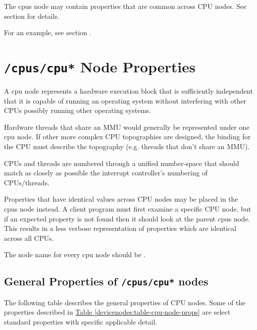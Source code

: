 \documentclass[a4paper,10pt,oneside]{sphinxmanual}
\begin{document}
The cpus node may contain properties that are common across CPU nodes.
See section {\hyperref[devicenodes:sect\string-cpus\string-cpu\string-node\string-properties]{}} for details.

For an example, see section {\hyperref[devicenodes:sect\string-cpu\string-node\string-example]{}}.


\section{\texttt{/cpus/cpu*} Node Properties}
\label{devicenodes:sect-cpus-cpu-node-properties}\label{devicenodes:cpus-cpu-node-properties}
A cpu node represents a hardware execution block that is sufficiently
independent that it is capable of running an operating system without
interfering with other CPUs possibly running other operating systems.

Hardware threads that share an MMU would generally be represented under
one cpu node. If other more complex CPU topographies are designed, the
binding for the CPU must describe the topography (e.g. threads that
don’t share an MMU).

CPUs and threads are numbered through a unified number-space that should
match as closely as possible the interrupt controller’s numbering of
CPUs/threads.

Properties that have identical values across CPU nodes may be placed in
the cpus node instead. A client program must first examine a specific
CPU node, but if an expected property is not found then it should look
at the parent cpus node. This results in a less verbose representation
of properties which are identical across all CPUs.

The node name for every cpu node should be .


\subsection{General Properties of \texttt{/cpus/cpu*} nodes}
\label{devicenodes:general-properties-of-cpus-cpu-nodes}
The following table describes the general properties of CPU nodes. Some
of the properties described in \hyperref[devicenodes:table-cpu-node-props]{Table \ref{devicenodes:table-cpu-node-props}} are select
standard properties with specific applicable detail.
\end{document}
